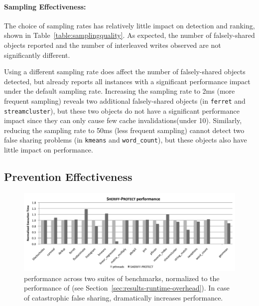 \paragraph{Sampling Effectiveness:}
The choice of sampling rates has relatively little impact on detection and ranking, shown in Table~\ref{table:samplingquality}. As expected, the number of falsely-shared objects reported and the number of interleaved writes observed are not significantly different.

Using a different sampling rate does affect the number of falsely-shared objects detected, but \SheriffDetect{} already reports all instances with a significant performance impact under the default sampling rate. Increasing the sampling rate to 2ms (more frequent sampling) reveals two additional falsely-shared objects (in \texttt{ferret} and \texttt{streamcluster}), but these two objects do not have a significant performance impact since they can only cause few cache invalidations(under 10). Similarly, reducing the sampling rate to 50ms (less frequent sampling) cannot detect two false sharing problems (in \texttt{kmeans} and \texttt{word\_count}), but these objects also have little impact on performance.


\subsection{Prevention Effectiveness}
\label{sec:protectperformance}

\begin{figure}[!t]
\centering
\includegraphics[width=5in]{sheriff/figure/patrolperf.pdf}
\caption{\sheriffprotect{} performance across two suites of benchmarks, normalized to the performance of \pthreads{} (see Section~\ref{sec:results-runtime-overhead}). In case of catastrophic false sharing, \sheriffdetect{} dramatically increases performance.
\label{fig:patrol}}
\end{figure}

